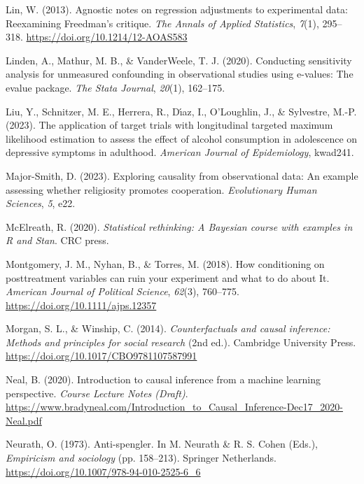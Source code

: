 \documentclass[
  single column]{article}
\newlength{\cslhangindent}
\newenvironment{CSLReferences}[2] %
 {\begin{list}{}{%
  \setlength{\itemindent}{0pt}
  \setlength{\leftmargin}{0pt}
  \setlength{\parsep}{0pt}
  \ifodd #1
   \setlength{\leftmargin}{\cslhangindent}
   \setlength{\itemindent}{-1\cslhangindent}
  \fi
  \setlength{\itemsep}{#2\baselineskip}}}
 {\end{list}}
\begin{document}
\begin{CSLReferences}{1}{0}
Lin, W. (2013). {Agnostic notes on regression adjustments to
experimental data: Reexamining Freedman's critique}. \emph{The Annals of
Applied Statistics}, \emph{7}(1), 295--318.
\url{https://doi.org/10.1214/12-AOAS583}

Linden, A., Mathur, M. B., \& VanderWeele, T. J. (2020). Conducting
sensitivity analysis for unmeasured confounding in observational studies
using e-values: The evalue package. \emph{The Stata Journal},
\emph{20}(1), 162--175.

Liu, Y., Schnitzer, M. E., Herrera, R., Dı́az, I., O'Loughlin, J., \&
Sylvestre, M.-P. (2023). The application of target trials with
longitudinal targeted maximum likelihood estimation to assess the effect
of alcohol consumption in adolescence on depressive symptoms in
adulthood. \emph{American Journal of Epidemiology}, kwad241.

Major-Smith, D. (2023). Exploring causality from observational data: An
example assessing whether religiosity promotes cooperation.
\emph{Evolutionary Human Sciences}, \emph{5}, e22.

McElreath, R. (2020). \emph{Statistical rethinking: A {B}ayesian course
with examples in {R} and {S}tan}. CRC press.

Montgomery, J. M., Nyhan, B., \& Torres, M. (2018). How conditioning on
posttreatment variables can ruin your experiment and what to do about
It. \emph{American Journal of Political Science}, \emph{62}(3),
760--775. \url{https://doi.org/10.1111/ajps.12357}

Morgan, S. L., \& Winship, C. (2014). \emph{Counterfactuals and causal
inference: Methods and principles for social research} (2nd ed.).
Cambridge University Press.
\url{https://doi.org/10.1017/CBO9781107587991}

Neal, B. (2020). Introduction to causal inference from a machine
learning perspective. \emph{Course Lecture Notes (Draft)}.
\url{https://www.bradyneal.com/Introduction_to_Causal_Inference-Dec17_2020-Neal.pdf}

Neurath, O. (1973). Anti-spengler. In M. Neurath \& R. S. Cohen (Eds.),
\emph{Empiricism and sociology} (pp. 158--213). Springer Netherlands.
\url{https://doi.org/10.1007/978-94-010-2525-6_6}


\end{CSLReferences}
\end{document}
